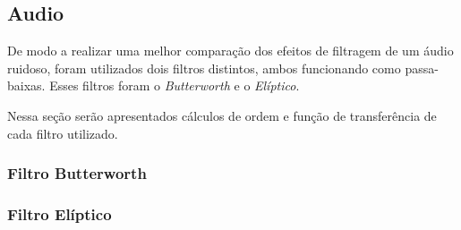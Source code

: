 \subsection{Audio}
De modo a realizar uma melhor comparação dos efeitos de filtragem de um áudio ruidoso, foram utilizados dois filtros distintos, ambos funcionando como passa-baixas. Esses filtros foram o \textit{Butterworth} e o \textit{Elíptico}.

Nessa seção serão apresentados cálculos de ordem e função de transferência de cada filtro utilizado.

\subsubsection{Filtro Butterworth}


\subsubsection{Filtro Elíptico}

